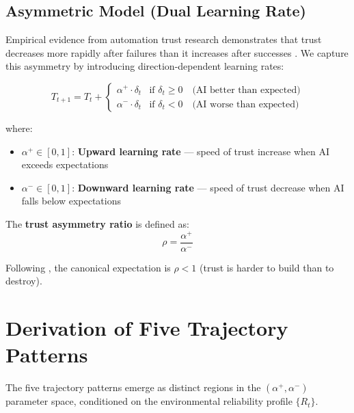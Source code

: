 \documentclass[12pt]{article}
\begin{document}
\subsection{Asymmetric Model (Dual Learning Rate)}

Empirical evidence from automation trust research demonstrates that
trust decreases more rapidly after failures than it increases after
successes \citep{lee1992trust, dzindolet2003role}. We capture this
asymmetry by introducing direction-dependent learning rates:

\begin{equation}
  \boxed{T_{t+1} = T_t +
    \begin{cases}
      \alpha^+ \cdot \delta_t & \text{if } \delta_t \geq 0
        \quad \text{(AI better than expected)} \\
      \alpha^- \cdot \delta_t & \text{if } \delta_t < 0
        \quad \text{(AI worse than expected)}
    \end{cases}}
  \label{eq:asymmetric}
\end{equation}

where:
\begin{itemize}
  \item $\alpha^+ \in [0,1]$: \textbf{Upward learning rate}
    --- speed of trust increase when AI exceeds expectations
  \item $\alpha^- \in [0,1]$: \textbf{Downward learning rate}
    --- speed of trust decrease when AI falls below expectations
\end{itemize}

The \textbf{trust asymmetry ratio} is defined as:
\begin{equation}
  \rho = \frac{\alpha^+}{\alpha^-}
\end{equation}

Following \citet{lee1992trust}, the canonical expectation is $\rho < 1$
(trust is harder to build than to destroy).

\section{Derivation of Five Trajectory Patterns}

The five trajectory patterns emerge as distinct regions in the
$(\alpha^+, \alpha^-)$ parameter space, conditioned on the
environmental reliability profile $\{R_t\}$.
\end{document}
